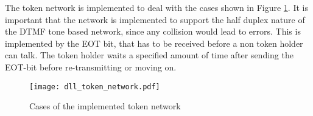 The token network is implemented to deal with the cases shown in Figure
\ref{fig:dll_token_network}. It is important that the network is implemented to
support the half duplex nature of the DTMF tone based network, since any
collision would lead to errors. This is implemented by the EOT bit, that has to
be received before a non token holder can talk. The token holder waits a specified
amount of time after sending the EOT-bit before re-transmitting or moving on.

\begin{figure}[htb]
	\begin{center}
	\texttt{[image: dll\_token\_network.pdf]}
	\caption{Cases of the implemented token network}
	\label{fig:dll_token_network}	
	\end{center}
\end{figure}